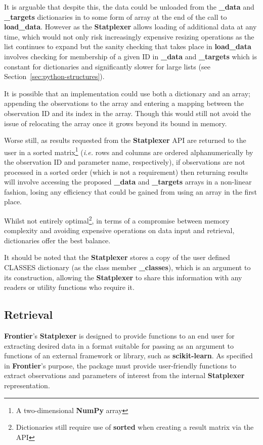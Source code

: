 It is arguable that despite this, the data could be unloaded from the
\textbf{\_data} and \textbf{\_targets} dictionaries in to some form of array at
the end of the call to \textbf{load\_data}. However as the \textbf{Statplexer}
allows loading of additional data at any time, which would not only risk
increasingly expensive resizing operations as the list continues to expand but
the sanity checking that takes place in \textbf{load\_data} involves checking
for membership of a given ID in \textbf{\_data} and \textbf{\_targets} which is
constant for dictionaries and significantly slower for large lists (see
Section~\ref{sec:python-structures}).

It is possible that an implementation could use both a dictionary and an array;
appending the observations to the array and entering a mapping between the
observation ID and its index in the array.  Though this would still not avoid
the issue of relocating the array once it grows beyond its bound in memory.

Worse still, as results requested from the \textbf{Statplexer} API are returned
to the user in a sorted matrix\footnote{A two-dimensional \textbf{NumPy} array}
(\textit{i.e.} rows and columns are ordered alphanumerically by the observation
ID and parameter name, respectively), if observations are not processed in a
sorted order (which is not a requirement) then returning results will involve
accessing the proposed \textbf{\_data} and \textbf{\_targets} arrays in a
non-linear fashion, losing any efficiency that could be gained from using an
array in the first place.

Whilst not entirely optimal\footnote{Dictionaries still require use of
\textbf{sorted} when creating a result matrix via the API}, in terms of a
compromise between memory complexity and avoiding expensive operations on data
input and retrieval, dictionaries offer the best balance.

It should be noted that the \textbf{Statplexer} stores a copy of the user
defined CLASSES dictionary (as the class member \textbf{\_classes}), which is an
argument to its construction, allowing the \textbf{Statplexer} to share this
information with any readers or utility functions who require it.


\subsection{Retrieval}

\textbf{Frontier}'s \textbf{Statplexer} is designed to provide functions to an
end user for extracting desired data in a format suitable for passing as an
argument to functions of an external framework or library, such as
\textbf{scikit-learn}. As specified in \textbf{Frontier}'s purpose, the package
must provide user-friendly functions to extract observations and parameters of
interest from the internal \textbf{Statplexer} representation.

